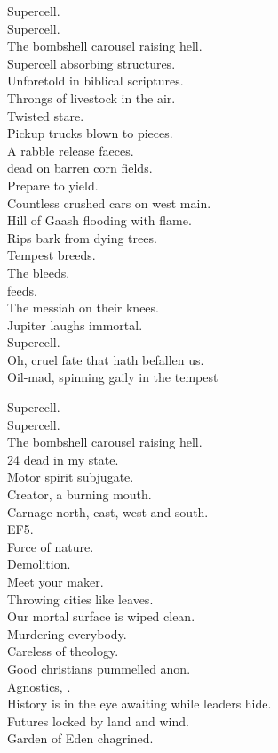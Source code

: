 Supercell. \\
Supercell. \\
The bombshell carousel raising hell. \\

Supercell absorbing structures. \\
Unforetold in biblical scriptures. \\
Throngs of livestock in the air. \\
Twisted stare. \\
Pickup trucks blown to pieces. \\
A rabble release faeces. \\
 dead on barren corn fields. \\
Prepare to yield. \\
Countless crushed cars on west main. \\
Hill of Gaash flooding with flame. \\
Rips bark from dying trees. \\
Tempest breeds. \\
The  bleeds. \\
 feeds. \\
The messiah on their knees. \\
Jupiter laughs immortal. \\
Supercell. \\

Oh, cruel fate that hath befallen us. \\
Oil-mad, spinning gaily in the tempest\

Supercell. \\
Supercell. \\
The bombshell carousel raising hell. \\

24 dead in my state. \\
Motor spirit subjugate. \\
Creator, a burning mouth. \\
Carnage north, east, west and south. \\
EF5. \\
Force of nature. \\
Demolition. \\
Meet your maker. \\
Throwing cities like leaves. \\
Our mortal surface is wiped clean. \\

Murdering everybody. \\
Careless of theology. \\
Good christians pummelled anon. \\
Agnostics, . \\
History is in the eye awaiting  while leaders hide. \\
Futures locked by land and wind. \\
Garden of Eden chagrined. \\

